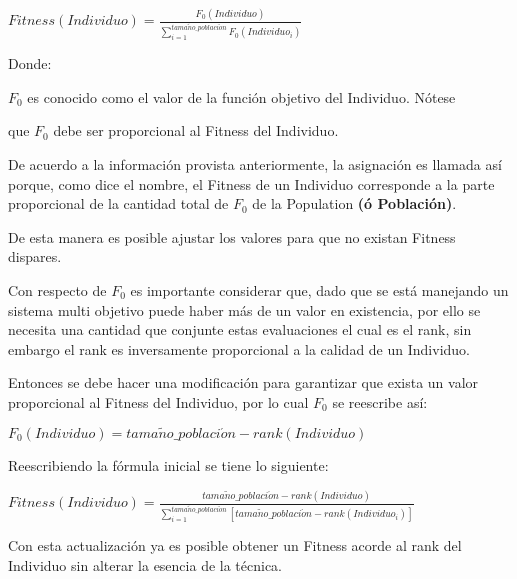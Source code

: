 \documentclass[letterpaper,10pt,english]{sphinxmanual}
\begin{document}
\begin{center}\(Fitness(Individuo) = \frac{F_0(Individuo)}{\sum_{i=1}^{tama\tilde{n}o\_poblaci\acute{o}n}F_0(Individuo_i)}\)
\end{center}
\begin{DUlineblock}{0em}
\item[] Donde:
\item[]
\begin{DUlineblock}{\DUlineblockindent}
\item[] \(F_0\) es conocido como el valor de la función objetivo del Individuo. Nótese
\item[] que \(F_0\) debe ser proporcional al Fitness del Individuo.
\item[] 
\end{DUlineblock}
\item[] De acuerdo a la información provista anteriormente, la asignación es llamada así porque,
como dice el nombre, el Fitness de un Individuo corresponde a la parte proporcional
de la cantidad total de \(F_0\) de la Population \textbf{(ó Población)}.
\item[] De esta manera es posible ajustar los valores para que no existan Fitness dispares.
\item[] Con respecto de \(F_0\) es importante considerar que, dado que se está manejando
un sistema multi objetivo puede haber más de un valor en existencia,  por ello se necesita
una cantidad que conjunte estas evaluaciones el cual es el rank, sin embargo el rank es inversamente
proporcional a la calidad de un Individuo.
\item[] Entonces se debe hacer una modificación para garantizar que exista un valor
proporcional al Fitness del Individuo, por lo cual \(F_0\) se reescribe así:
\end{DUlineblock}

\begin{center}\(F_0(Individuo) = tama\tilde{n}o\_poblaci\acute{o}n - rank(Individuo)\)
\end{center}
\begin{DUlineblock}{0em}
\item[] Reescribiendo la fórmula inicial se tiene lo siguiente:
\end{DUlineblock}

\begin{center}\(Fitness(Individuo) = \frac{tama\tilde{n}o\_poblaci\acute{o}n - rank(Individuo)}{\sum_{i=1}^{tama\tilde{n}o\_poblaci\acute{o}n}[tama\tilde{n}o\_poblaci\acute{o}n - rank(Individuo_i)]}\)
\end{center}
\begin{DUlineblock}{0em}
\item[] Con esta actualización ya es posible obtener un Fitness acorde al rank del Individuo sin alterar
la esencia de la técnica.
\end{DUlineblock}
\label{Model/Fitness/ProportionalFitness:module-Model.Fitness.ProportionalFitness}
\end{document}
